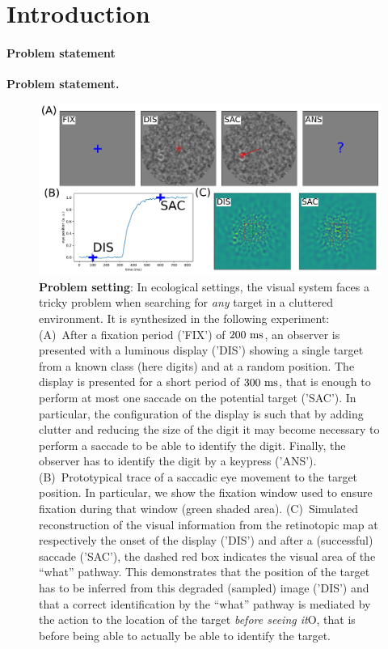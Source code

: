 \CNS
\section{Introduction}
\label{sec:intro}
\paragraph{Problem statement}
\else
\textbf{Problem statement. }
\fi
\begin{figure}[b!]%
	\includegraphics[width=\linewidth]{fig_intro}
	\caption{
		{\bf Problem setting}: \CNS In ecological settings, the visual system faces a tricky problem when searching for \emph{any} target in a cluttered environment. It is synthesized in the following experiment:\fi
		(A)~After a fixation period ('FIX') of $200~\si{\milli\second}$, an observer is presented with a luminous display ('DIS') showing a single target from a known class (here digits) and at a random position. The display is presented for a short period of $300~\si{\milli\second}$, that is enough to perform at most one saccade on the potential target ('SAC'). \CNS In particular, the configuration of the display is such that by adding clutter and reducing the size of the digit it may become necessary to perform a saccade to be able to identify the digit. \fi  Finally, the observer has to identify the digit by a keypress ('ANS'). %
		(B)~Prototypical trace of a saccadic eye movement to the target position. \CNS In particular, we show the fixation window used to ensure fixation during that window (green shaded area). \fi (C)~Simulated reconstruction of the visual information from the retinotopic map at respectively the onset of the display ('DIS') and after a (successful) saccade ('SAC'), the dashed red box indicates the visual area of the ``what'' pathway. This demonstrates that the position of the target has to be inferred from this degraded (sampled) image ('DIS') and that a correct identification by the ``what'' pathway is mediated by the action to the location of the target \emph{before seeing it}\if O\CNS , that is before being able to actually be able to identify the target\fi.
		\label{fig:intro}}%
\end{figure}%
